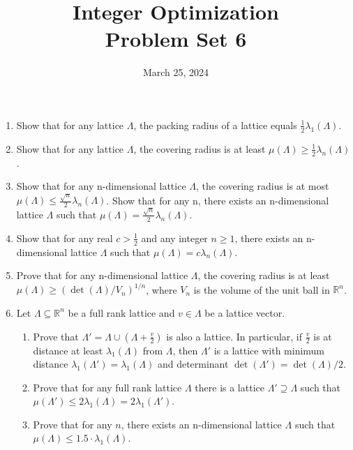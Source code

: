 \documentclass[11pt,a4paper]{article}
\title{Integer Optimization  \\ Problem Set 6 }
\date{ March 25, 2024}
\begin{document}
\maketitle 


\begin{enumerate}
\item Show that for any lattice $Λ$, the packing radius of a lattice equals $\frac{1}{2}λ_1(Λ)$.

\item Show that for any lattice $Λ$, the covering radius is at least $μ(Λ) ≥ \frac{1}{2} λ_n (Λ)$.

\item Show that for any n-dimensional lattice $Λ$, the covering radius is at most $
μ(Λ) ≤ \frac{\sqrt{n}}{2} λ_n(Λ)$. Show that for any n, there exists an n-dimensional lattice $Λ$ such that $μ(Λ) =\frac{\sqrt{n}}{2} λ_n(Λ)$.

\item Show that for any real $c > \frac{1}{2}$ and any integer $n ≥ 1$, there exists an n- dimensional lattice $Λ$ such that $μ(Λ) = cλ_n(Λ)$.

\item Prove that for any n-dimensional lattice $Λ$, the covering radius is at least $μ(Λ) ≥ (\det(Λ)/V_n)^{1/n}$, where $V_n$ is the volume of the unit ball in $\mathbb{R}^n$.

\item Let $Λ ⊆ \mathbb{R}^n$ be a full rank lattice and $v ∈ Λ$ be a lattice vector. \begin{enumerate}
\item Prove that $Λ' = Λ ∪ (Λ + \frac{v}{2} )$ is also a lattice. In particular, if $\frac{v}{2}$ is at distance at least $λ_1 (Λ)$ from $Λ$, then $Λ'$ is a lattice with minimum distance $λ_1(Λ') = λ_1(Λ)$ and determinant $\det(Λ') = \det(Λ)/2$. 
\item Prove that for any full rank lattice $Λ$ there is a lattice $Λ' ⊇ Λ$ such that $μ(Λ') ≤ 2λ_1(Λ) = 2λ_1(Λ')$.
\item Prove that for any $n$, there exists an n-dimensional lattice $Λ$ such that $μ(Λ) ≤ 1.5 \cdot λ_1(Λ)$.
\end{enumerate}



\end{enumerate}


%
%


 
\end{document}

